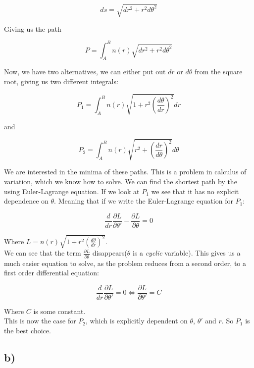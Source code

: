 \documentclass[a4paper,norsk, 10pt]{article}
\begin{document}
$$
ds = \sqrt{dr^2 + r^2d\theta^2}
$$

Giving us the path

$$
P = \int_A^B n(r) \sqrt{dr^2 + r^2d\theta^2}
$$

Now, we have two alternatives, we can either put out $dr$ or $d\theta$ from the square root, giving us two different integrals:

\begin{equation}
P_1 = \int_A^B n(r)\sqrt{1 + r^2 \left(\frac{d\theta}{dr}\right)^2} dr
\label{eq:p1}
\end{equation}



and

\begin{equation}
P_2 = \int_A^B n(r)\sqrt{r^2 +  \left(\frac{dr}{d\theta}\right)^2} d\theta
\label{eq:p2}
\end{equation}



We are interested in the minima of these paths. This is a problem in calculus of variation, which we know how to solve. We can find the shortest path by the using Euler-Lagrange equation. If we look at $P_1$ we see that it has no explicit dependence on $\theta$. Meaning that if we write the Euler-Lagrange equation for $P_1$:

$$
\frac{d}{dr}\frac{\partial L}{\partial \theta'} - \frac{\partial L}{\partial \theta} = 0
$$ 

Where $L = n(r)\sqrt{1 + r^2 \left(\frac{d\theta}{dr}\right)^2}$.\\

We can see that the term $\frac{\partial L}{\partial \theta}$ disappears($\theta$ is a \textit{cyclic} variable). This gives us a much easier equation to solve, as the problem reduces from a second order, to a first order differential equation:

\begin{equation}
\frac{d}{dr}\frac{\partial L}{\partial \theta'} = 0 \Leftrightarrow \frac{\partial L}{\partial \theta'} = C
\label{eq:lagrange}
\end{equation}

Where $C$ is some constant.\\

This is now the case for $P_2$, which is explicitly dependent on $\theta$, $\theta'$ and $r$. So $P_1$ is the best choice.

\newpage
\subsection*{b)}
\end{document}
